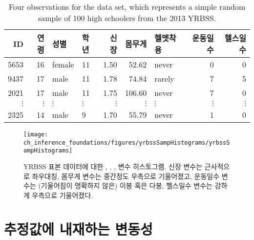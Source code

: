 \begin{table}
\centering
\begin{tabular}{rrllrrlrr}
  \hline
ID & 연령 & 성별 & 학년 & 신장 & 몸무게 & 헬멧착용 & 운동일수 & 헬스일수 \\ 
  \hline
5653 &  16 & female & 11 & 1.50 & 52.62 & never &   0 &   0 \\ 
  9437 &  17 & male & 11 & 1.78 & 74.84 & rarely &   7 &   5 \\ 
  2021 &  17 & male & 11 & 1.75 & 106.60 & never &   7 &   0 \\ 
  $\vdots$ & $\vdots$ & $\vdots$ & $\vdots$ & $\vdots$ & $\vdots$ & $\vdots$ & $\vdots$ & $\vdots$ \\
  2325 &  14 & male & 9 & 1.70 & 55.79 & never &   1 &   0 \\ 
   \hline
\end{tabular}
\caption{Four observations for the  data set, which represents a simple random sample of 100 high schoolers from the 2013 YRBSS.}
\label{yrbssSampDF}
\end{table}

\begin{figure}
\centering
\texttt{[image: ch\_inference\_foundations/figures/yrbssSampHistograms/yrbssSampHistograms]} 
\caption{ YRBSS 표본 데이터에 대한 , , ,  변수 히스토그램. 신장  변수는 근사적으로 좌우대칭, 몸무게  변수는 중간정도 우측으로 기울어졌고, 운동일수  변수는 (기울어짐이 명확하지 않은) 이봉 혹은 다봉, 헬스일수  변수는 강하게 우측으로 기울어졌다.}
\label{yrbssSampHistograms}
\end{figure}


\section[Variability in estimates]{추정값에 내재하는 변동성 }
\label{variabilityInEstimates}

